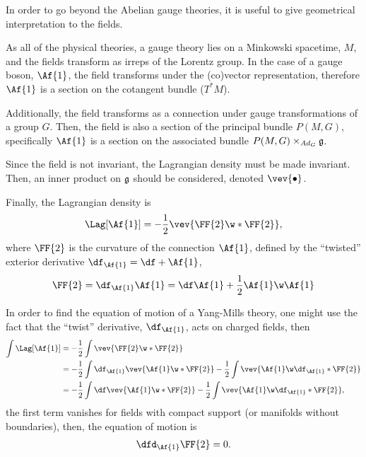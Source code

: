 In order to go beyond the Abelian gauge theories, it is useful to give geometrical interpretation to the fields.

As all of the physical theories, a gauge theory lies on a Minkowski spacetime, $M$, and the fields transform as irreps of the Lorentz group. In the case of a gauge boson,  $\Af{1}$, the field transforms under the (co)vector representation, therefore $\Af{1}$ is a section on the cotangent bundle ($T^*M$).

Additionally, the field transforms as a connection under gauge transformations of a group $G$. Then, the field is also a section of the principal bundle $P(M,G)$, specifically $\Af{1}$ is a section on the associated bundle $P(M,G)\times_{Ad_G}\frak{g}$.

Since the field is not invariant, the Lagrangian density must be made invariant. Then, an inner product on $\frak{g}$ should be considered, denoted $\vev{\bullet}$.

Finally, the Lagrangian density is
\begin{align}
  \Lag[\Af{1}] =-\frac{1}{2} \vev{\FF{2}\w*\FF{2}},
\end{align}
where $\FF{2}$ is the curvature of the connection $\Af{1}$, defined by the ``twisted'' exterior derivative $\df_{\Af{1}}= \df +\Af{1}$,
\begin{align}
  \FF{2}= \df_{\Af{1}}\Af{1}= \df\Af{1} +\frac{1}{2}\Af{1}\w\Af{1}
\end{align}


\begin{WEbox}[frametitle={Equations of Motion for Yang-Mills Theories},
  frametitlerule=true,
  frametitlealignment=\centering,
  frametitleaboveskip=10pt,]
  In order to find the equation of motion of a Yang-Mills theory, one might use the fact that the ``twist'' derivative, $\df_{\Af{1}}$, acts on charged fields, then
  \begin{align*}
    \int \Lag[\Af{1}] &=-\frac{1}{2}\int \vev{\FF{2}\w*\FF{2}}\\
    &=-\frac{1}{2}\int \df_{\Af{1}}\vev{\Af{1}\w*\FF{2}}-\frac{1}{2}\int \vev{\Af{1}\w\df_{\Af{1}}*\FF{2}}\\
    &=-\frac{1}{2}\int \df\vev{\Af{1}\w*\FF{2}}-\frac{1}{2}\int \vev{\Af{1}\w\df_{\Af{1}}*\FF{2}},
  \end{align*}
  the first term vanishes for fields with compact support (or manifolds without boundaries), then, the equation of motion is 
  \begin{align*}
    \dfd_{\Af{1}}\FF{2} =0.
  \end{align*}
\end{WEbox}
   




